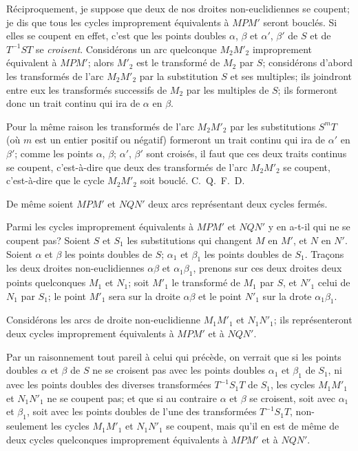 \documentclass{article}
\begin{document}
Réciproquement, je suppose que deux de nos droites non-euclidiennes se coupent; je dis que tous les cycles improprement équivalents à $MPM'$ seront bouclés. Si elles se coupent en effet, c'est que les points doubles $\alpha$, $\beta$ et $\alpha'$, $\beta'$ de $S$ et de $T^{-1}ST$ se \emph{croisent}. Considérons un arc quelconque $M_{2}M'_{2}$ improprement équivalent à $MPM'$; alors $M'_{2}$ est le transformé de $M_{2}$ par $S$; considérons d'abord les transformés de l'arc $M_{2}M'_{2}$ par la substitution $S$ et ses multiples; ils joindront entre eux les transformés successifs de $M_{2}$ par les multiples de $S$; ils formeront donc un trait continu qui ira de $\alpha$ en $\beta$.

Pour la même raison les transformés de l'arc $M_{2}M'_{2}$ par les substitutions $S^{m}T$ (où $m$ est un entier positif ou négatif) formeront un trait continu qui ira de $\alpha'$ en $\beta'$; comme les points $\alpha$, $\beta$; $\alpha'$, $\beta'$ sont croisés, il faut que ces deux traits continus se coupent, c'est-à-dire que deux des transformés de l'arc $M_{2}M'_{2}$ se coupent, c'est-à-dire que le cycle $M_{2}M'_{2}$ soit bouclé. C.~Q.~F.~D.

De même soient $MPM'$ et $NQN'$ deux arcs représentant deux cycles fermés.

Parmi les cycles improprement équivalents à $MPM'$ et $NQN'$ y en a-t-il qui ne se coupent pas? Soient $S$ et $S_{1}$ les substitutions qui changent $M$ en $M'$, et $N$ en $N'$. Soient $\alpha$ et $\beta$ les points doubles de $S$; $\alpha_{1}$ et $\beta_{1}$ les points doubles de $S_{1}$. Traçons les deux droites non-euclidiennes $\alpha\beta$ et $\alpha_{1}\beta_{1}$, prenons sur ces deux droites deux points quelconques $M_{1}$ et $N_{1}$; soit $M'_{1}$ le transformé de $M_{1}$ par $S$, et $N'_{1}$ celui de $N_{1}$ par $S_{1}$; le point $M'_{1}$ sera sur la droite $\alpha\beta$ et le point $N'_{1}$ sur la drote $\alpha_{1}\beta_{1}$.

Considérons les arcs de droite non-euclidienne $M_{1}M'_{1}$ et $N_{1}N'_{1}$; ils représenteront deux cycles improprement équivalents à $MPM'$ et à $NQN'$.


Par un raisonnement tout pareil à celui qui précède, on verrait que si les points doubles $\alpha$ et $\beta$ de $S$ ne se croisent pas avec les points doubles $\alpha_{1}$ et $\beta_{1}$ de $S_{1}$, ni avec les points doubles des diverses transformées $T^{-1}S_{1}T$ de $S_{1}$, les cycles $M_{1}M'_{1}$ et $N_{1}N'_{1}$ ne se coupent pas; et que si au contraire $\alpha$ et $\beta$ se croisent, soit avec $\alpha_{1}$ et $\beta_{1}$, soit avec les points doubles de l'une des transformées $T^{-1}S_{1}T$, non-seulement les cycles $M_{1}M'_{1}$ et $N_{1}N'_{1}$ se coupent, mais qu'il en est de même de deux cycles quelconques improprement équivalents à $MPM'$ et à $NQN'$.
\end{document}
